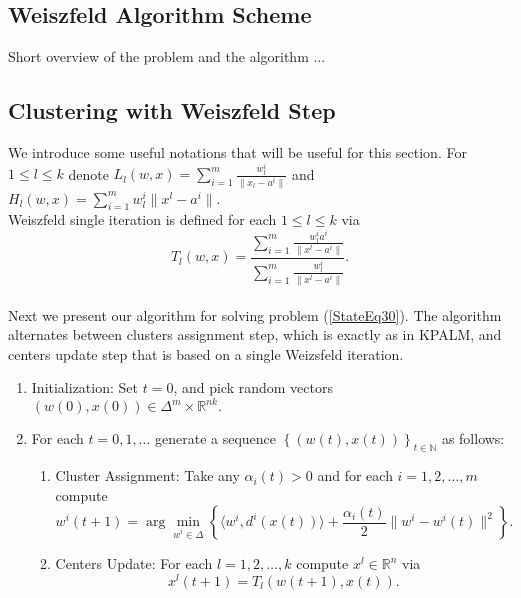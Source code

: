 \documentclass[11pt]{article}
\numberwithin{equation}{section}
\begin{document}
\subsection{Weiszfeld Algorithm Scheme}
Short overview of the problem and the algorithm ...

\subsection{Clustering with Weiszfeld Step}

We introduce some useful notations that will be useful for this section. 
For $1 \leq l \leq k$ denote $L_l(w,x)= \sum\limits_{i=1}^{m}\frac{w^i_l}{\|x_l - a^i\|}$ and $H_l(w,x)= \sum\limits_{i=1}^{m} w^i_l \|x^l - a^i\|$. \\
Weiszfeld single iteration is defined for each $1 \leq l \leq k$ via
\begin{equation}
T_l(w,x) = \frac{\sum\limits_{i=1}^{m}\frac{w^i_la^i}{\|x^l - a^i\|}}{\sum\limits_{i=1}^{m}\frac{w^i_l}{\|x^l - a^i\|}} . \label{StateEq31}
\end{equation} \\
Next we present our algorithm for solving problem (\ref{StateEq30}).  The algorithm alternates between clusters assignment step, which is exactly as in KPALM, and centers update step that is based on a single Weizsfeld iteration.

\begin{enumerate}[(1)]
	\item Initialization: Set $t=0$, and pick random vectors $(w(0),x(0)) \in \Delta^m \times \mathbb{R}^{nk} .$

	\item For each $t=0,1, \ldots$ generate a sequence $\left\lbrace(w(t),x(t))\right\rbrace_{t \in \mathbb{N}}$ as follows:
	\begin{enumerate}[(2.1)]
		\item Cluster Assignment: Take any $\alpha_i(t) > 0$ and for each $i=1, 2, \ldots ,m$ compute
		\begin{equation}
			w^i(t+1) = \arg\min\limits_{w^i \in \Delta} \left\lbrace \langle w^i , d^i(x(t)) \rangle + \frac{\alpha_i(t)}{2} \|w^i - w^i(t)\|^2 \right\rbrace . \label{StateEq32}
		\end{equation}
		
		\item Centers Update: For each $l=1, 2, \ldots ,k$ compute $x^l \in \mathbb{R}^n$ via
		\begin{equation}
			x^l(t+1) = T_l(w(t+1),x(t)) . \label{StateEq33}
		\end{equation}
	\end{enumerate}
\end{enumerate}
\end{document}
